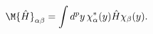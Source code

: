 \begin{equation}
\M{\hat{H}}_{\alpha\beta} = \int d^py\, \chi_{\alpha}^*(y)\hat{H}\chi_{\beta}(y) .
\label{2.20A}
\end{equation}

